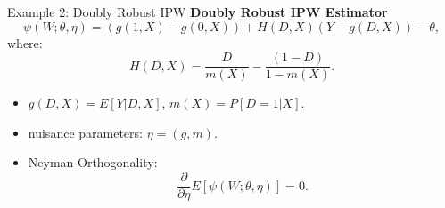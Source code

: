 \documentclass[xcolor=svgnames,t]{beamer}
\begin{document}
                        \begin{frame}{Example 2: Doubly Robust IPW}
                        \textbf{Doubly Robust IPW Estimator}
                        \[
                        \psi(W; \theta, \eta) = \left(g(1, X) - g(0, X)\right) + H(D, X)(Y - g(D, X)) - \theta,
                        \]
                        where:
                        \[
                        H(D, X) = \frac{D}{m(X)} - \frac{(1-D)}{1-m(X)}.
                        \]
                        \pause
                        \begin{itemize}
                            \item \(g(D, X) = E[Y | D, X]\), \(m(X) = P[D=1 | X]\).
                            \item nuisance parameters: \(\eta = (g, m)\).
                            \item Neyman Orthogonality:
                            \[
                            \frac{\partial}{\partial \eta} E[\psi(W; \theta, \eta)] = 0.
                            \]
                        \end{itemize}
                        \end{frame}
                        
\end{document}
